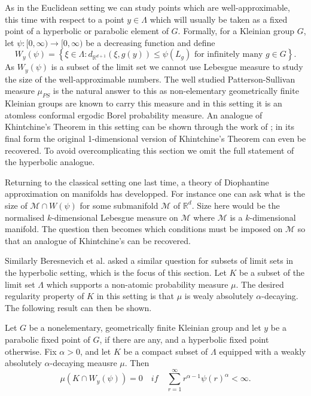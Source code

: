 As in the Euclidean setting we can study points which are well-approximable, this time with respect to a point $y \in \Lambda$ which will usually be taken as a fixed point of a hyperbolic or parabolic element of $G$. Formally, for a Kleinian group $G$, let $\psi \colon [0,\infty) \rightarrow [0,\infty)$ be a decreasing function and define
\[
W_y(\psi) = \left\{ \xi \in \Lambda \colon d_{\mathbb{R}^{d+1}}(\xi, g(y)) \le \psi(L_g) \text{ for infinitely many } g \in G \right\}.
\]
As $W_y(\psi)$ is a subset of the limit set we cannot use Lebesgue measure to study the size of the well-approximable numbers. The well studied Patterson-Sullivan measure $\mu_{PS}$ is the natural answer to this as non-elementary geometrically finite Kleinian groups are known to carry this measure and in this setting it is an atomless conformal ergodic Borel probability measure. An analogue of Khintchine's Theorem in this setting can be shown through the work of \cite{patterson, stratmann, stratmann-velani, beres-dick-velani}; in its final form the original 1-dimensional version of Khintchine's Theorem can even be recovered. To avoid overcomplicating this section we omit the full statement of the hyperbolic analogue.

Returning to the classical setting one last time, a theory of Diophantine approximation on manifolds has developped. For instance one can ask what is the size of $\mathcal{M} \cap W(\psi)$ for some submanifold $\mathcal{M}$ of $\mathbb{R}^d$. Size here would be the normalised $k$-dimensional Lebesgue measure on $\mathcal{M}$ where $\mathcal{M}$ is a $k$-dimensional manifold. The question then becomes which conditions must be imposed on $\mathcal{M}$ so that an analogue of Khintchine's can be recovered.

Similarly Beresnevich et al. \cite{beres-sanju-al} asked a similar question for subsets of limit sets in the hyperbolic setting, which is the focus of this section. Let $K$ be a subset of the limit set $\Lambda$ which supports a non-atomic probability measure $\mu$. The desired regularity property of $K$ in this setting is that $\mu$ is wealy absolutely $\alpha$-decaying. The following result can then be shown.

\begin{theorem}
	Let $G$ be a nonelementary, geometrically finite Kleinian group and let $y$ be a parabolic fixed point of $G$, if there are any, and a hyperbolic fixed point otherwise. Fix $\alpha > 0$, and let $K$ be a compact subset of $\Lambda$ equipped with a weakly absolutely $\alpha$-decaying meausre $\mu$. Then
	\[
	\mu(K\cap W_y(\psi)) = 0 \quad if \quad \sum_{r=1}^\infty r^{\alpha-1} \psi(r)^{\alpha} < \infty.
	\]
\end{theorem}

